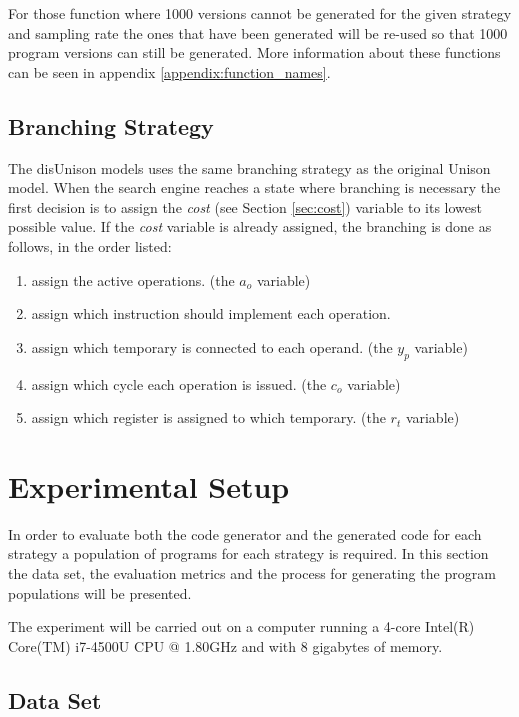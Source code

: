 For those function where 1000 versions cannot be generated for the given strategy and
sampling rate the ones that have been generated will be re-used so that 1000 program
versions can still be generated. More information about these functions can be seen in
appendix \ref{appendix:function_names}.

\section{Branching Strategy}
\label{sec:branch_strategy}

The disUnison models uses the same branching strategy as the original Unison model. When
the search engine reaches a state where branching is necessary the first decision is to
assign the \textit{cost} (see Section \ref{sec:cost}) variable to its lowest possible
value. If the \textit{cost} variable is already assigned, the branching is done as
follows, in the order listed:

\begin{enumerate}
	\item assign the active operations. (the $a_o$ variable)
	\item assign which instruction should implement each operation.
	\item assign which temporary is connected to each operand. (the $y_p$ variable)
	\item assign which cycle each operation is issued. (the $c_o$ variable)
	\item assign which register is assigned to which temporary. (the $r_t$ variable)
\end{enumerate}

\chapter{Experimental Setup}

In order to evaluate both the code generator and the generated code for each strategy a
population of programs for each strategy is required. In this section the data set, the
evaluation metrics and the process for generating the program populations will be
presented.

The experiment will be carried out on a computer running a 4-core Intel(R) Core(TM)
i7-4500U CPU @ 1.80GHz and with 8 gigabytes of memory.

\section{Data Set}

